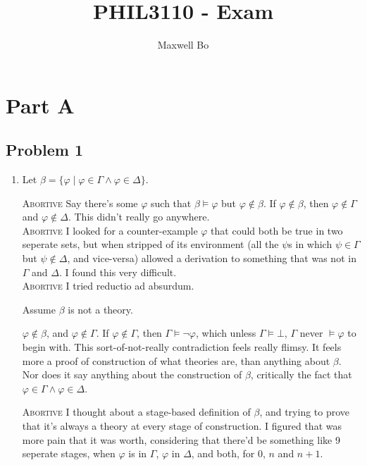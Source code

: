 \documentclass[a4paper]{article}
\title{PHIL3110 - Exam}
\author{Maxwell Bo}
\newcommand{\SET}[1]{\{ {#1} \}}
\begin{document}
 

\maketitle

\section*{Part A}

\subsection*{Problem 1}

\begin{enumerate}

    \item

Let $\beta = \SET{ \varphi \mid \varphi \in \Gamma \wedge \varphi \in \Delta }$.

    \textsc{Abortive} Say there's some $\varphi$ such that $\beta \models \varphi$ but $\varphi \not\in \beta$. If $\varphi \not\in \beta$, then $\varphi \not\in \Gamma$ and $\varphi \not\in \Delta$. This didn't really go anywhere.\\

    \textsc{Abortive} I looked for a counter-example $\varphi$ that could both be true in two seperate sets, but when stripped of its environment (all the $\psi$s in which $\psi \in \Gamma$ but $\psi \not\in \Delta$, and vice-versa) allowed a derivation to something that was not in $\Gamma$ and $\Delta$. I found this very difficult.\\

    \textsc{Abortive} I tried reductio ad absurdum. 

    Assume $\beta$ is not a theory. 
    
    $\varphi \not\in \beta$, and $\varphi \not\in \Gamma$. If $\varphi \not \in \Gamma$, then $\Gamma \models \neg \varphi$, which unless $\Gamma \models \bot$, $\Gamma$ never $\models \varphi$ to begin with. This sort-of-not-really contradiction feels really flimsy. It feels more a proof of construction of what theories are, than anything about $\beta$. Nor does it say anything about the construction of $\beta$, critically the fact that $\varphi \in \Gamma \wedge \varphi \in \Delta$.

    \textsc{Abortive} I thought about a stage-based definition of $\beta$, and trying to prove that it's always a theory at every stage of construction. I figured that was more pain that it was worth, considering that there'd be something like 9 seperate stages, when $\varphi$ is in $\Gamma$, $\varphi$ in $\Delta$, and both, for $0$, $n$ and $n + 1$.


\end{enumerate}
\end{document}
